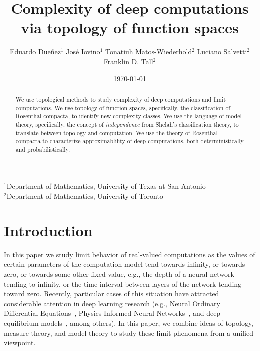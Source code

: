 \documentclass[psamsfonts]{amsart}
\title[Complexity of deep computations via topology of function spaces]{Complexity of deep computations\\ via topology of function spaces}
\author[Dueñez, Iovino, Matos-Wiederhold, Salvetti, Tall]{
Eduardo Dueñez$^{1}$ \qquad
José Iovino$^{1}$ \qquad
Tonatiuh Matos-Wiederhold$^{2}$ \qquad
Luciano Salvetti$^{2}$ \qquad
Franklin D. Tall$^{2}$
}
\date{\today}
\theoremstyle{definition}
\theoremstyle{remark}
\numberwithin{equation}{section}
\begin{document}
\maketitle

{\centering\tiny\vspace{-0.6cm}
$^{1}$Department of Mathematics, University of Texas at San Antonio\\
$^{2}$Department of Mathematics, University of Toronto\\
}

\begin{abstract}
We use topological methods to study complexity of deep computations and limit computations.
We use topology of function spaces, specifically, the classification of Rosenthal compacta, to identify new complexity classes.
We use the language of model theory, specifically,  the concept of  \emph{independence} from Shelah's classification theory, to translate between topology and computation.
We use the theory of Rosenthal compacta to characterize approximablility of deep computations, both deterministically and probabilistically.
\end{abstract}

\maketitle



\section*{Introduction}


In this paper we study limit behavior of real-valued computations as the values of certain parameters  of the computation model tend towards infinity, or towards zero, or towards some other fixed value, e.g.,  the depth of a neural network tending to infinity, or the time interval between layers of the network tending toward zero.
Recently, particular cases of this situation have attracted considerable attention in deep learning research (e.g., Neural Ordinary Differential Equations~\cite{Chen:2018}, Physics-Informed Neural Networks~\cite{Raissi-Perdikaris-Karniadakis:2019},  and  deep equilibrium models~\cite{Bai:2019}, among others).
In this paper, we combine ideas of topology, measure theory, and  model theory to study these limit phenomena from a unified viewpoint.
\end{document}
